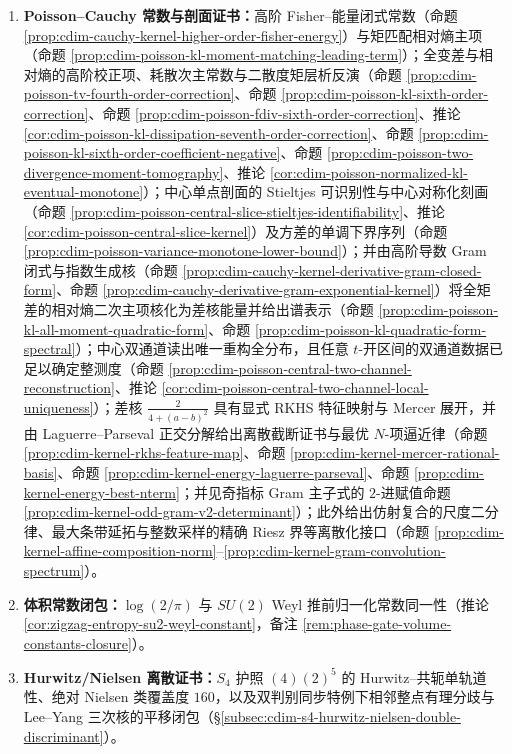 \begin{enumerate}
  \item \textbf{Poisson--Cauchy 常数与剖面证书：}高阶 Fisher--能量闭式常数（命题 \ref{prop:cdim-cauchy-kernel-higher-order-fisher-energy}）与矩匹配相对熵主项（命题 \ref{prop:cdim-poisson-kl-moment-matching-leading-term}）；全变差与相对熵的高阶校正项、耗散次主常数与二散度矩层析反演（命题 \ref{prop:cdim-poisson-tv-fourth-order-correction}、命题 \ref{prop:cdim-poisson-kl-sixth-order-correction}、命题 \ref{prop:cdim-poisson-fdiv-sixth-order-correction}、推论 \ref{cor:cdim-poisson-kl-dissipation-seventh-order-correction}、命题 \ref{prop:cdim-poisson-kl-sixth-order-coefficient-negative}、命题 \ref{prop:cdim-poisson-two-divergence-moment-tomography}、推论 \ref{cor:cdim-poisson-normalized-kl-eventual-monotone}）；中心单点剖面的 Stieltjes 可识别性与中心对称化刻画（命题 \ref{prop:cdim-poisson-central-slice-stieltjes-identifiability}、推论 \ref{cor:cdim-poisson-central-slice-kernel}）及方差的单调下界序列（命题 \ref{prop:cdim-poisson-variance-monotone-lower-bound}）；并由高阶导数 Gram 闭式与指数生成核（命题 \ref{prop:cdim-cauchy-kernel-derivative-gram-closed-form}、命题 \ref{prop:cdim-cauchy-derivative-gram-exponential-kernel}）将全矩差的相对熵二次主项核化为差核能量并给出谱表示（命题 \ref{prop:cdim-poisson-kl-all-moment-quadratic-form}、命题 \ref{prop:cdim-poisson-kl-quadratic-form-spectral}）；中心双通道读出唯一重构全分布，且任意 \texorpdfstring{$t$}{t}-开区间的双通道数据已足以确定整测度（命题 \ref{prop:cdim-poisson-central-two-channel-reconstruction}、推论 \ref{cor:cdim-poisson-central-two-channel-local-uniqueness}）；差核 \(\frac{2}{4+(a-b)^2}\) 具有显式 RKHS 特征映射与 Mercer 展开，并由 Laguerre--Parseval 正交分解给出离散截断证书与最优 \(N\)-项逼近律（命题 \ref{prop:cdim-kernel-rkhs-feature-map}、命题 \ref{prop:cdim-kernel-mercer-rational-basis}、命题 \ref{prop:cdim-kernel-energy-laguerre-parseval}、命题 \ref{prop:cdim-kernel-energy-best-nterm}；并见奇指标 Gram 主子式的 \(2\)-进赋值命题 \ref{prop:cdim-kernel-odd-gram-v2-determinant}）；此外给出仿射复合的尺度二分律、最大条带延拓与整数采样的精确 Riesz 界等离散化接口（命题 \ref{prop:cdim-kernel-affine-composition-norm}--\ref{prop:cdim-kernel-gram-convolution-spectrum}）。
  \item \textbf{体积常数闭包：}\(\log(2/\pi)\) 与 \(SU(2)\) Weyl 推前归一化常数同一性（推论 \ref{cor:zigzag-entropy-su2-weyl-constant}，备注 \ref{rem:phase-gate-volume-constants-closure}）。
  \item \textbf{Hurwitz/Nielsen 离散证书：}\(S_4\) 护照 \((4)(2)^5\) 的 Hurwitz--共轭单轨道性、绝对 Nielsen 类覆盖度 \(160\)，以及双判别同步特例下相邻整点有理分歧与 Lee--Yang 三次核的平移闭包（\S\ref{subsec:cdim-s4-hurwitz-nielsen-double-discriminant}）。

\end{enumerate}
